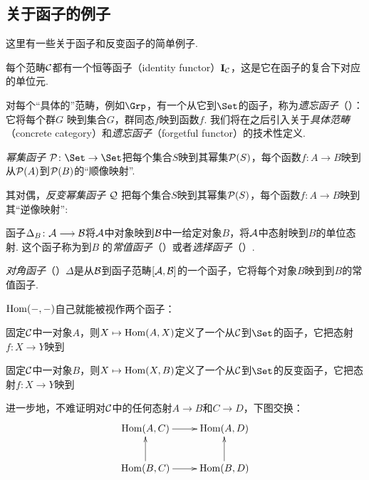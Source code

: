 \subsection{关于函子的例子}
  这里有一些关于函子和反变函子的简单例子.
  \begin{exam}
    每个范畴${\cal C}$都有一个恒等函子（identity functor）$\operatorname{\mathbf{I}}_{{\cal C}}$，这是它在函子的复合下对应的单位元. 
  \end{exam}
  \begin{exam}
    对每个``具体的''范畴，例如$\Grp$，有一个从它到$\Set$的函子，称为\emph{遗忘函子}（）：它将每个群$G$ 映到集合$G$，群同态$f$映到函数$f$. 我们将在之后引入关于\emph{具体范畴}（concrete category）和\emph{遗忘函子}（forgetful functor）的技术性定义.
  \end{exam}
  \begin{exam}  
    \emph{幂集函子} $\Pp\colon\Set\to\Set$把每个集合$S$映到其幂集${\cal P}(S)$，每个函数$f\colon A\to B$映到从${\cal P}(A)$到${\cal P}(B)$的``顺像映射''.

    其对偶，\emph{反变幂集函子} ${\cal Q}$ 把每个集合$S$映到其幂集${\cal P}(S)$，每个函数$f\colon A\to B$映到其``逆像映射'':
  \end{exam}
  \begin{exam}
    函子$\Delta_B\colon{\cal A} \longrightarrow {\cal B}$将${\cal A}$中对象映到${\cal B}$中一给定对象$B$，将${\cal A}$中态射映到$B$的单位态射. 这个函子称为到$B$ 的\emph{常值函子}（）或者\emph{选择函子}（）.
  \end{exam}
  \begin{exam}
    \emph{对角函子}（）$\Delta$是从${\cal B}$到函子范畴$[{\cal A},{\cal B}]$的一个函子，它将每个对象$B$映到到$B$的常值函子.
  \end{exam}
  \begin{exam}
    $\operatorname{Hom}(-,-)$自己就能被视作两个函子：

    固定${\cal C}$中一对象$A$，则$X\mapsto\operatorname{Hom}(A,X)$定义了一个从${\cal C}$到$\Set$的函子，它把态射$f\colon X\to Y$映到

    固定${\cal C}$中一对象$B$，则$X\mapsto\operatorname{Hom}(X,B)$定义了一个从${\cal C}$到$\Set$的反变函子，它把态射$f\colon X\to Y$映到

    进一步地，不难证明对${\cal C}$中的任何态射$A\to B$和$C\to D$，下图交换：
    \begin{displaymath}
      \xymatrix{
         \Hom(A,C)\ar[r]&\Hom(A,D)\\
         \Hom(B,C)\ar[r]\ar[u]&\Hom(B,D)\ar[u]
      }
    \end{displaymath}
  \end{exam}

